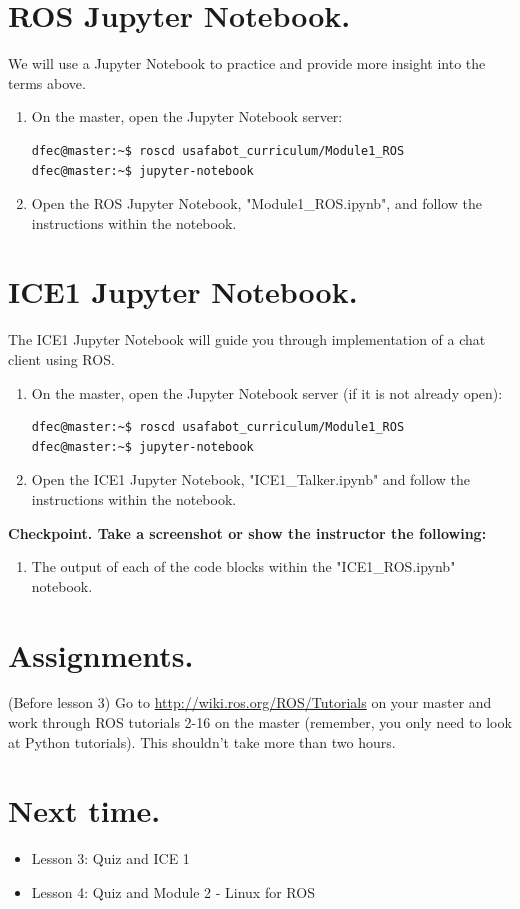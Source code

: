 \documentclass{handout}
\begin{document}
\newpage
\clearpage
\pagebreak

\section{ROS Jupyter Notebook.}
We will use a Jupyter Notebook to practice and provide more insight into the terms above.

\begin{enumerate}
\item On the master, open the Jupyter Notebook server:

\begin{lstlisting}[language=bash]
dfec@master:~$ roscd usafabot_curriculum/Module1_ROS
dfec@master:~$ jupyter-notebook
\end{lstlisting}

\item Open the ROS Jupyter Notebook, "Module1\_ROS.ipynb", and follow the instructions within the notebook.

\end{enumerate}

\section{ICE1 Jupyter Notebook.}
The ICE1 Jupyter Notebook will guide you through implementation of a chat client using ROS.

\begin{enumerate}\setlength\itemsep{1em}
	\item On the master, open the Jupyter Notebook server (if it is not already open):
\begin{lstlisting}[language=bash]
dfec@master:~$ roscd usafabot_curriculum/Module1_ROS
dfec@master:~$ jupyter-notebook
\end{lstlisting}

\item Open the ICE1 Jupyter Notebook, "ICE1\_Talker.ipynb" and follow the instructions within the notebook. 
\end{enumerate}

\textbf{Checkpoint. Take a screenshot or show the instructor the following:}
\begin{enumerate}
	\item The output of each of the code blocks within the "ICE1\_ROS.ipynb" notebook.
\end{enumerate}

\section{Assignments.}
	\begin{todolist}
		\item (Before lesson 3) Go to \url{http://wiki.ros.org/ROS/Tutorials} on your master and work through ROS tutorials 2-16 on the master (remember, you only need to look at Python tutorials). This shouldn't take more than two hours.
	\end{todolist}

\section{Next time.}
	\begin{itemize}
		\item Lesson 3: Quiz and ICE 1
		\item Lesson 4: Quiz and Module 2 - Linux for ROS
	\end{itemize}
\end{document}
